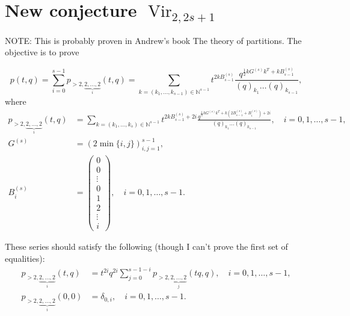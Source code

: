 \documentclass[a4paper, 12pt, reqno]{amsart}
\DeclareMathOperator{\Vir}{Vir}
\begin{document}
\section{New conjecture $\Vir_{2, 2s + 1}$}
\label{sec:new-conjecture-vir_2}

NOTE: This is probably proven in Andrew's book The theory of partitions.
The objective is to prove

\begin{equation*}
  p(t, q) = \sum_{i = 0}^{s - 1}p_{>2, \underbrace{\scriptstyle{2, \dots, 2}}_i}(t, q) = \sum_{k = (k_1, \dots, k_{s - 1}) \in \mathbb{N}^{s - 1}}t^{2kB^{(s)}_{s - 1}}\frac{q^{\frac{1}{2}kG^{(s)}k^T + kB^{(s)}_{s - 1}}}{(q)_{k_1}\dots (q)_{k_{s - 1}}},
\end{equation*}
where
\begin{align*}
  p_{>2, \underbrace{\scriptstyle{2, \dots, 2}}_i}(t, q) &= \sum_{k = (k_1, \dots, k_s) \in \mathbb{N}^{s - 1}}t^{2kB^{(s)}_{s - 1} + 2i}\frac{q^{\frac{1}{2}kG^{(s)}k^T + k(2B^{(s)}_{s - 1} + B^{(s)}_i) + 2i}}{(q)_{k_1}\dots(q)_{k_{s - 1}}}, \quad i = 0, 1, \dots, s - 1, \\
  G^{(s)} &= (2\min\{i, j\})_{i, j = 1}^{s - 1}, \\
  B^{(s)}_i &=
              \left(\begin{smallmatrix}
                      0 \\
                      0 \\
                      \vdots \\
                      0 \\
                      1 \\
                      2 \\
                      \vdots \\
                      i
                    \end{smallmatrix}\right), \quad i = 0, 1, \dots, s - 1.  
\end{align*}

These series should satisfy the following (though I can't prove the first set of equalities):
\begin{align*}
  p_{>2, \underbrace{\scriptstyle{2, \dots, 2}}_i}(t, q) &= t^{2i}q^{2i}\sum_{j = 0}^{s - 1 - i}p_{>2, \underbrace{\scriptstyle{2, \dots, 2}}_j}(tq, q), \quad i = 0, 1, \dots, s - 1, \\
  p_{>2, \underbrace{\scriptstyle{2, \dots, 2}}_i}(0, 0) &= \delta_{0, i}, \quad i = 0, 1, \dots, s - 1.
\end{align*}
\end{document}
